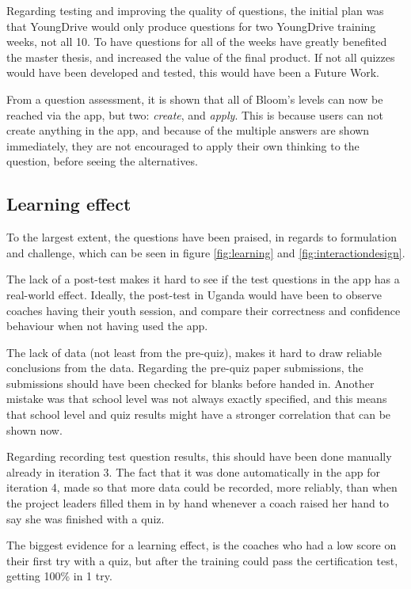 
  Regarding testing and improving the quality of questions, the initial plan was that YoungDrive would only produce questions for two YoungDrive training weeks, not all 10. To have questions for all of the weeks have greatly benefited the master thesis, and increased the value of the final product. If not all quizzes would have been developed and tested, this would have been a Future Work.

  From a question assessment, it is shown that all of Bloom's levels can now be reached via the app, but two: \textit{create}, and \textit{apply}. This is because users can not create anything in the app, and because of the multiple answers are shown immediately, they are not encouraged to apply their own thinking to the question, before seeing the alternatives.

  \subsection{Learning effect}
  To the largest extent, the questions have been praised, in regards to formulation and challenge, which can be seen in figure \ref{fig:learning} and \ref{fig:interactiondesign}.

  The lack of a post-test makes it hard to see if the test questions in the app has a real-world effect. Ideally, the post-test in Uganda would have been to observe coaches having their youth session, and compare their correctness and confidence behaviour when not having used the app. %

  The lack of data (not least from the pre-quiz), makes it hard to draw reliable conclusions from the data. Regarding the pre-quiz paper submissions, the submissions should have been checked for blanks before handed in. Another mistake was that school level was not always exactly specified, and this means that school level and quiz results might have a stronger correlation that can be shown now.

  Regarding recording test question results, this should have been done manually already in iteration 3. The fact that it was done automatically in the app for iteration 4, made so that more data could be recorded, more reliably, than when the project leaders filled them in by hand whenever a coach raised her hand to say she was finished with a quiz.

  The biggest evidence for a learning effect, is the coaches who had a low score on their first try with a quiz, but after the training could pass the certification test, getting 100\% in 1 try. 
